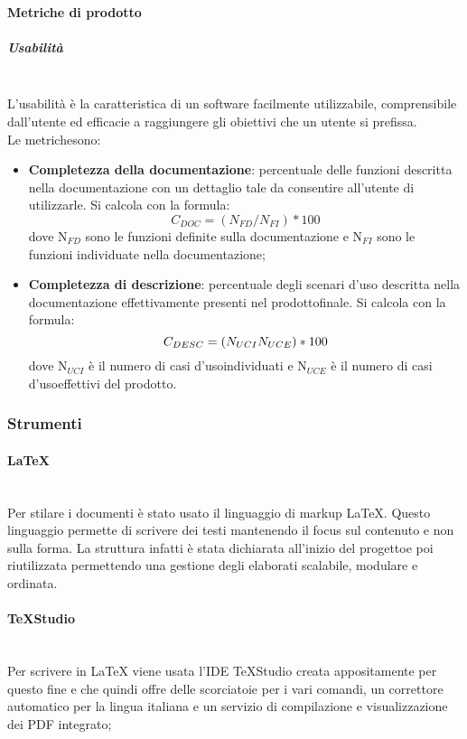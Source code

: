                 \paragraph{Metriche di prodotto}
                \subparagraph{Usabilità} \mbox{}\\[1mm]
	            L'usabilità è la caratteristica di un software facilmente utilizzabile, comprensibile dall'utente ed efficacie a raggiungere gli obiettivi che un utente si prefissa.\\
	            Le metriche\glosp sono:
	            \begin{itemize}
		        \item \textbf{Completezza della documentazione}: percentuale delle funzioni descritta nella documentazione con un dettaglio tale da consentire all'utente di utilizzarle. Si calcola con la formula:
		        \[C_{DOC}=(N_{FD}/N_{FI})*100\]
		        dove N$_{FD}$ sono le funzioni definite sulla documentazione e N$_{FI}$ sono le funzioni individuate nella documentazione;
		        \item \textbf{Completezza di descrizione}: percentuale degli scenari d’uso descritta nella documentazione effettivamente presenti nel prodotto\glosp finale. Si calcola con la formula:
		        \[C_{DESC}=(N_{UCI}\\N_{UCE})*100\]
		        dove N$_{UCI}$ è il numero di casi d'uso\glosp individuati e N$_{UCE}$ è il numero di casi d'uso\glosp effettivi del prodotto\glo.
	            \end{itemize}
            \subsubsection{Strumenti}
                \paragraph{\LaTeX}\mbox{}\\ [1mm]
                    Per stilare i documenti è stato usato il linguaggio di markup \LaTeX \xspace. Questo linguaggio permette di scrivere dei testi mantenendo il focus
                    sul contenuto e non sulla forma. La struttura infatti è stata dichiarata all'inizio del progetto\glosp e poi riutilizzata permettendo una gestione degli elaborati scalabile, modulare e ordinata.
                \paragraph{TeXStudio}\mbox{}\\ [1mm]
                    Per scrivere in \LaTeX \xspace viene usata l'IDE TeXStudio creata appositamente per questo fine e che quindi offre delle scorciatoie
                    per i vari comandi, un correttore automatico per la lingua italiana e un servizio di compilazione e visualizzazione dei PDF integrato;
